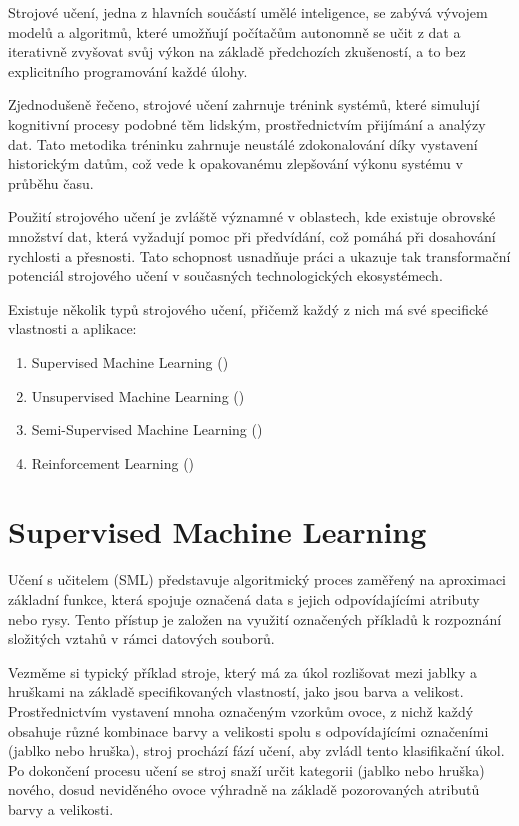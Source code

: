 Strojové učení, jedna z hlavních součástí umělé inteligence, se zabývá vývojem modelů a algoritmů, které umožňují počítačům autonomně se učit z dat a iterativně zvyšovat svůj výkon na základě předchozích zkušeností, a to bez explicitního programování každé úlohy.

Zjednodušeně řečeno, strojové učení zahrnuje trénink systémů, které simulují kognitivní procesy podobné těm lidským, prostřednictvím přijímání a analýzy dat. Tato metodika tréninku zahrnuje neustálé zdokonalování díky vystavení historickým datům, což vede k opakovanému zlepšování výkonu systému v průběhu času.

Použití strojového učení je zvláště významné v oblastech, kde existuje obrovské množství dat, která vyžadují pomoc při předvídání, což pomáhá při dosahování rychlosti a přesnosti. Tato schopnost usnadňuje práci a ukazuje tak transformační potenciál strojového učení v současných technologických ekosystémech.

Existuje několik typů strojového učení, přičemž každý z nich má své specifické vlastnosti a aplikace:
\begin{enumerate}
	\item Supervised Machine Learning ()
	\item Unsupervised Machine Learning ()
	\item Semi-Supervised Machine Learning ()		
	\item Reinforcement Learning ()
\end{enumerate}

\newpage

\section{Supervised Machine Learning}
Učení s učitelem (SML)\cite{Russellc1995} představuje algoritmický proces zaměřený na aproximaci základní funkce, která spojuje označená data s jejich odpovídajícími atributy nebo rysy. Tento přístup je založen na využití označených příkladů k rozpoznání složitých vztahů v rámci datových souborů.

Vezměme si typický příklad stroje, který má za úkol rozlišovat mezi jablky a hruškami na základě specifikovaných vlastností, jako jsou barva a velikost. Prostřednictvím vystavení mnoha označeným vzorkům ovoce, z nichž každý obsahuje různé kombinace barvy a velikosti spolu s odpovídajícími označeními (jablko nebo hruška), stroj prochází fází učení, aby zvládl tento klasifikační úkol. Po dokončení procesu učení se stroj snaží určit kategorii (jablko nebo hruška) nového, dosud neviděného ovoce výhradně na základě pozorovaných atributů barvy a velikosti.

